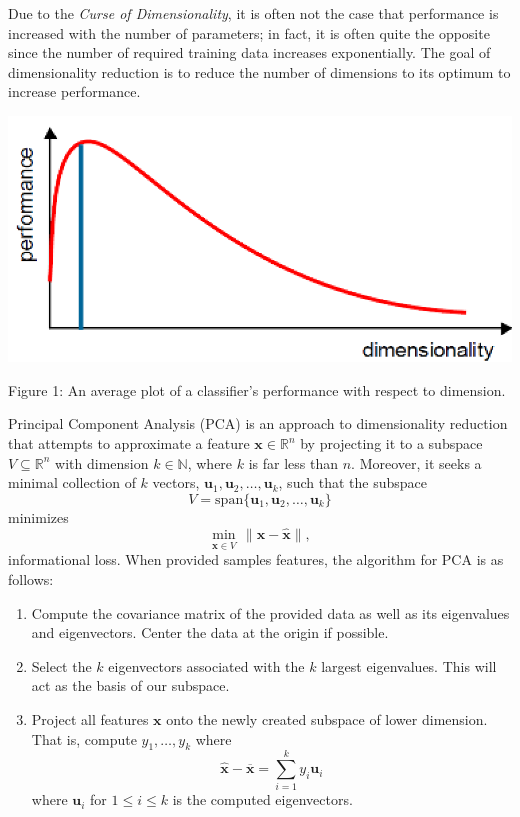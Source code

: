 \documentclass[ 12pt ]{article}
\begin{document}
\qquad Due to the \textit{Curse of Dimensionality}, it is often not the case that performance is increased with the number of parameters; in fact, it is often quite the opposite since the
number of required training data increases exponentially. The goal of dimensionality reduction is to reduce the number of dimensions to its optimum to increase performance.
\begin{center}
    \includegraphics[scale=0.7]{optimum dim}
\end{center}
\begin{center}
    \scriptsize
    Figure 1: An average plot of a classifier's performance with respect to dimension.
\end{center}
Principal Component Analysis (PCA) is an approach to dimensionality reduction that attempts to approximate a feature $\textbf{x} \in \mathbb{R}^n$ by projecting it to a subspace
$V \subseteq \mathbb{R}^n$ with dimension $k \in \mathbb{N}$, where $k$ is far less than $n$. Moreover, it seeks a minimal collection of $k$ vectors, $\textbf{u}_1, \textbf{u}_2, \hdots,
\textbf{u}_k$, such that the subspace $$V = \mathrm{span}\{ \textbf{u}_1, \textbf{u}_2, \hdots, \textbf{u}_k \}$$ minimizes $$\min_{\widehat{\textbf{x}} \in V}\, \lVert \textbf{x} -
\widehat{\textbf{x}} \rVert,$$ informational loss. When provided samples features, the algorithm for PCA is as follows:
\begin{enumerate}
    \item Compute the covariance matrix of the provided data as well as its eigenvalues and eigenvectors. Center the data at the origin if possible.
    \item Select the $k$ eigenvectors associated with the $k$ largest eigenvalues. This will act as the basis of our subspace.
    \item Project all features $\textbf{x}$ onto the newly created subspace of lower dimension. That is, compute $y_1, \hdots, y_k$ where $$\widehat{\textbf{x}} - \overline{\textbf{x}} =
        \sum_{i=1}^k y_i \textbf{u}_i$$ where $\textbf{u}_i$ for $1 \leq i \leq k$ is the computed eigenvectors.
\end{enumerate}
\end{document}
